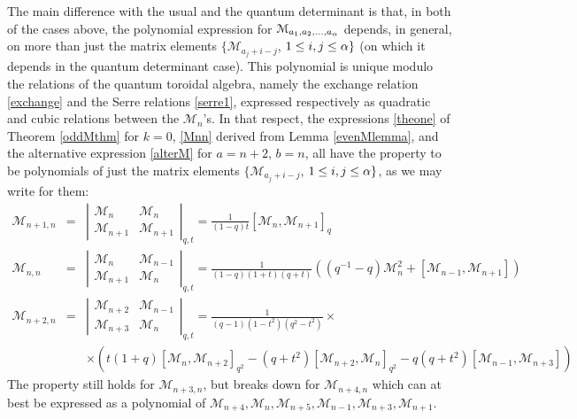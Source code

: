 The main difference with the usual and the quantum determinant is that, in both of the cases above, the polynomial expression for ${\mathcal M}_{a_1,a_2,...,a_{\alpha}}$ depends, in general, on more than just the
matrix elements $\{{\mathcal M}_{a_j+i-j}$, $1\leq i, j \leq {\alpha}\}$ (on which it depends in the quantum determinant case). This polynomial is unique modulo the relations of
the quantum toroidal algebra, namely the exchange relation \eqref{exchange} and the Serre relations \eqref{serre1}, 
expressed respectively as quadratic and cubic relations between the ${\mathcal M}_n$'s. 
In that respect, the expressions \eqref{theone} of Theorem \ref{oddMthm} for $k=0$,
 \eqref{Mnn} derived from Lemma \ref{evenMlemma}, and the alternative expression \eqref{alterM}
 for $a=n+2$, $b=n$, all have the property to be polynomials of just the matrix elements 
 $\{{\mathcal M}_{a_j+i-j}$, $1\leq i, j \leq {\alpha}\}$, as we may write for them:
\begin{eqnarray*}
{\mathcal M}_{n+1,n}&=&\left\vert \begin{matrix} {\mathcal M}_n & {\mathcal M}_{n} \\
{\mathcal M}_{n+1} & {\mathcal M}_{n+1}
\end{matrix}\right\vert_{q,t}=\frac{1}{(1-q)t} \left[ {\mathcal M}_n,  {\mathcal M}_{n+1}\right]_q\\
{\mathcal M}_{n,n}&=&\left\vert \begin{matrix} {\mathcal M}_n & {\mathcal M}_{n-1} \\
{\mathcal M}_{n+1} & {\mathcal M}_{n}
\end{matrix}\right\vert_{q,t}= \frac{1}{(1-q)(1+t)(q+t)} 
\left( (q^{-1}-q){\mathcal M}_n^2 +\left[{\mathcal M}_{n-1},{\mathcal M}_{n+1}\right]\right) \\
{\mathcal M}_{n+2,n}&=&\left\vert \begin{matrix} {\mathcal M}_{n+2} & {\mathcal M}_{n-1} \\
{\mathcal M}_{n+3} & {\mathcal M}_{n}
\end{matrix}\right\vert_{q,t}=\frac{1}{(q-1)(1-t^2)(q^2-t^2)} \times \\
&&\times
\left( t(1+q)\left[{\mathcal M}_{n},{\mathcal M}_{n+2}\right]_{q^2}-(q+t^2)\left[{\mathcal M}_{n+2},{\mathcal M}_{n}\right]_{q^2}-q(q+t^2)\left[{\mathcal M}_{n-1},{\mathcal M}_{n+3}\right]\right)
\end{eqnarray*}
The property still holds for ${\mathcal M}_{n+3,n}$, but breaks down for ${\mathcal M}_{n+4,n}$ which can at best be expressed as a polynomial
of ${\mathcal M}_{n+4},{\mathcal M}_{n},{\mathcal M}_{n+5},{\mathcal M}_{n-1},{\mathcal M}_{n+3},{\mathcal M}_{n+1}$.

